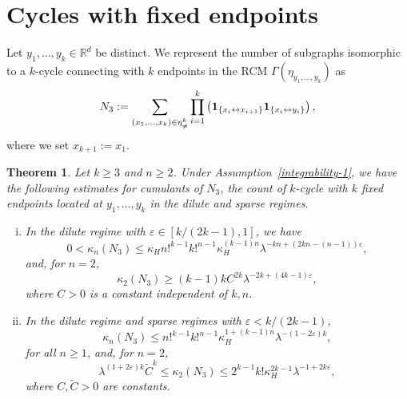 \documentclass[12pt]{article}
\newcommand{\R}{\mathbb{R}}
\newcommand{\bone}{{\bf 1}}
\newtheorem{thm}[prop]{Theorem}
\numberwithin{equation}{section}
\begin{document}
\section{Cycles with fixed endpoints}
 \noindent 
Let $y_1, \ldots ,y_k\in \R^d$ be distinct.
We represent the number of
subgraphs isomorphic to a $k$-cycle
connecting with $k$ endpoints 
in the RCM $\Gamma(\eta_{y_1, \ldots ,y_k})$
as 
\begin{equation}
\nonumber
  N_3:=\sum_{(x_1, \ldots , x_k)\in\eta_{\ne}^k}\prod_{i=1}^k\left(\bone_{\{x_i\leftrightarrow x_{i+1}\}}\bone_{\{x_i\leftrightarrow y_i\}}\right),
\end{equation}
 where we set $x_{k+1}:=x_1$. 
\begin{thm}\label{kcycle1}
  Let $k\geq 3$ and $n\geq 2$.
  Under Assumption~\eqref{integrability-1}, we have the following estimates for cumulants of $N_3$, the count of $k$-cycle with $k$ fixed endpoints 
  located at $y_1, \ldots ,y_k$ in the dilute and sparse regimes. 
\begin{enumerate}[i)]
\item In the dilute regime with $\varepsilon \in [k / ( 2k-1) , 1]$, we have
\begin{equation}
\nonumber
0<\kappa_n(N_3)\leq
\kappa_H
n!^{k-1} k!^{n-1}
 \kappa_H^{(k-1)n} \lambda^{- kn + ( 2kn-(n-1))\varepsilon },
\end{equation}
and, for $n=2$, 
\begin{equation}
\nonumber
\kappa_2(N_3)\geq (k-1)kC^{2k} \lambda^{-2k + (4k-1)\varepsilon }
,
\end{equation}
 where $C>0$ is a constant independent of $k,n$.
\item In the dilute regime and sparse regimes with
  $\varepsilon < k / ( 2k-1 )$, 
\begin{equation}
\nonumber
\kappa_n(N_3)\leq n!^{k-1} k!^{n-1}\kappa_H^{1+(k-1)n} \lambda^{-(1-2\varepsilon )k},
\end{equation}
for all $n\geq 1$, and, for $n=2$,  
\begin{equation}
\nonumber
\lambda^{(1+2\varepsilon )k}\widetilde{C}^k \leq \kappa_2(N_3)
\leq 2^{k-1}k!\kappa_H^{2k-1} \lambda^{-1+2k\varepsilon },
\end{equation}
where $C,\widetilde{C}>0$ are constants.
\end{enumerate}
\end{thm}
\end{document}
